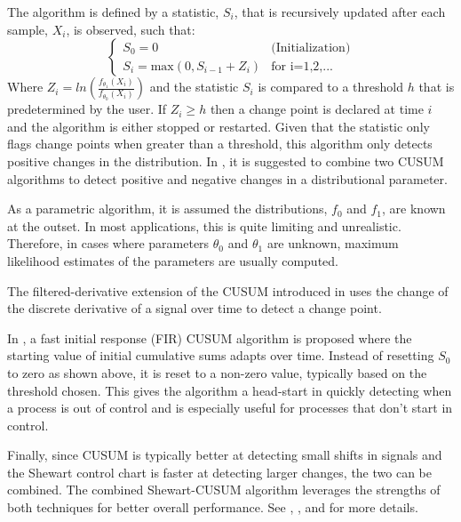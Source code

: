 The algorithm is defined by a statistic, $S_i$,  that is recursively updated after each sample, $X_i$, is observed, such that:
\begin{equation}
  \begin{cases}
    S_0 = 0  & \text{(Initialization)} \\
    S_i = \text{max}(0, S_{i-1} + Z_i) & \text{for i=1,2,...}
  \end{cases}
\end{equation}
Where $Z_i=ln(\frac{f_{\theta_1}(X_i)}{f_{\theta_0}(X_i)})$ and the statistic $S_i$ is compared to a threshold $h$ that is predetermined by the user. If $Z_i \geq h$ then a change point is declared at time $i$ and the algorithm is either stopped or restarted. Given that the statistic only flags change points when greater than a threshold, this algorithm only detects positive changes in the distribution. In \cite{page1954continuous}, it is suggested to combine two CUSUM algorithms to detect positive and negative changes in a distributional parameter.

As a parametric algorithm, it is assumed the distributions, $f_0$ and $f_1$, are known at the outset. In most applications, this is quite limiting and unrealistic. Therefore, in cases where parameters $\theta_0$ and $\theta_1$ are unknown, maximum likelihood estimates of the parameters are usually computed.

The filtered-derivative extension of the CUSUM introduced in \cite{basseville1981edge} uses the change of the discrete derivative of a signal over time to detect a change point. 

In \cite{lucas1982fast}, a fast initial response (FIR) CUSUM algorithm is proposed where the starting value of initial cumulative sums adapts over time. Instead of resetting $S_0$ to zero as shown above, it is reset to a non-zero value, typically based on the threshold chosen. This gives the algorithm a head-start in quickly detecting when a process is out of control and is especially useful for processes that don't start in control.

Finally, since CUSUM is typically better at detecting small shifts in signals and the Shewart control chart is faster at detecting larger changes, the two can be combined. The combined Shewart-CUSUM algorithm leverages the strengths of both techniques for better overall performance. See \cite{lucas1982combined}, \cite{yashchin1985analysis}, and \cite{westgard1977combined} for more details. 

